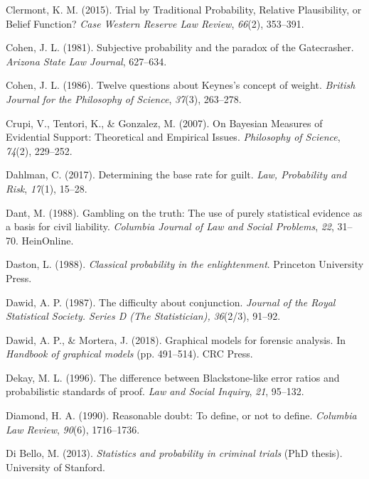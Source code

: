 \documentclass[11pt,dvipsnames,enabledeprecatedfontcommands]{scrartcl}
\begin{document}
\leavevmode\hypertarget{ref-clermont2015TrialTraditionalProbability}{}%
Clermont, K. M. (2015). Trial by Traditional Probability, Relative
Plausibility, or Belief Function? \emph{Case Western Reserve Law
Review}, \emph{66}(2), 353--391.

\leavevmode\hypertarget{ref-Cohen81}{}%
Cohen, J. L. (1981). Subjective probability and the paradox of the
Gatecrasher. \emph{Arizona State Law Journal}, 627--634.

\leavevmode\hypertarget{ref-cohen86}{}%
Cohen, J. L. (1986). Twelve questions about Keynes's concept of weight.
\emph{British Journal for the Philosophy of Science}, \emph{37}(3),
263--278.

\leavevmode\hypertarget{ref-crupi2007BayesianMeasuresEvidential}{}%
Crupi, V., Tentori, K., \& Gonzalez, M. (2007). On Bayesian Measures of
Evidential Support: Theoretical and Empirical Issues. \emph{Philosophy
of Science}, \emph{74}(2), 229--252.

\leavevmode\hypertarget{ref-dahlman2017}{}%
Dahlman, C. (2017). Determining the base rate for guilt. \emph{Law,
Probability and Risk}, \emph{17}(1), 15--28.

\leavevmode\hypertarget{ref-dant1988gambling}{}%
Dant, M. (1988). Gambling on the truth: The use of purely statistical
evidence as a basis for civil liability. \emph{Columbia Journal of Law
and Social Problems}, \emph{22}, 31--70. HeinOnline.

\leavevmode\hypertarget{ref-daston1988}{}%
Daston, L. (1988). \emph{Classical probability in the enlightenment}.
Princeton University Press.

\leavevmode\hypertarget{ref-dawid1987}{}%
Dawid, A. P. (1987). The difficulty about conjunction. \emph{Journal of
the Royal Statistical Society. Series D (The Statistician),}
\emph{36}(2/3), 91--92.

\leavevmode\hypertarget{ref-dawid2018graphical}{}%
Dawid, A. P., \& Mortera, J. (2018). Graphical models for forensic
analysis. In \emph{Handbook of graphical models} (pp. 491--514). CRC
Press.

\leavevmode\hypertarget{ref-Dekay1996}{}%
Dekay, M. L. (1996). The difference between Blackstone-like error ratios
and probabilistic standards of proof. \emph{Law and Social Inquiry},
\emph{21}, 95--132.

\leavevmode\hypertarget{ref-diamond90}{}%
Diamond, H. A. (1990). Reasonable doubt: To define, or not to define.
\emph{Columbia Law Review}, \emph{90}(6), 1716--1736.

\leavevmode\hypertarget{ref-di2013statistics}{}%
Di Bello, M. (2013). \emph{Statistics and probability in criminal
trials} (PhD thesis). University of Stanford.
\end{document}
